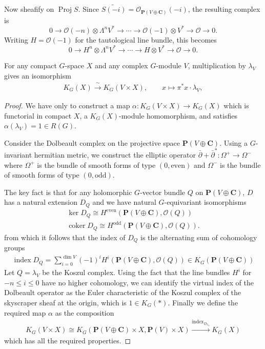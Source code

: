 \documentclass[12pt]{article}
\begin{document}
Now sheafify on $\operatorname{Proj}S$. Since
$\widetilde{S(-i)} = \mathcal O_{\mathbf P(V\oplus\mathbf C)}(-i)$, the resulting complex
is
\[
0\to \mathcal O(-n)\otimes\Lambda^nV^* \to\cdots\to \mathcal O(-1)\otimes V^* \to
\mathcal O \to 0.
\]
Writing $H=\mathcal O(-1)$ for the tautological line bundle, this becomes
\[
0\to H^n\otimes\Lambda^nV^* \to\cdots\to H\otimes V^* \to \mathcal O \to 0.
\]
\begin{theorem}
    For any compact $G$-space $X$ and any complex $G$-module $V$, multiplication by $\lambda_V$ gives an isomorphism
\begin{align*}
    K_G(X) \xrightarrow{\ \sim\ } K_G(V\times X), \qquad x\longmapsto \pi^*x\cdot\lambda_V,
\end{align*}
\end{theorem}
\begin{proof}
    We have only to construct a map $\alpha:K_G(V\times X)\to K_G(X)$ which is functorial in compact $X$, a $K_G(X)$-module homomorphism, and satisfies $\alpha(\lambda_V)=1 \in R(G)$. 

    Consider the Dolbeault complex on the projective space $\mathbf P(V\oplus\mathbf C)$. Using a $G$-invariant hermitian metric, we construct the elliptic operator $\bar\partial+\bar\partial^*:\Omega^+ \to \Omega^-$ where $\Omega^+$ is the bundle of smooth forms of type $(0,\mathrm{even})$ and $\Omega^-$ is the bundle of smooth forms of type $(0,\mathrm{odd})$.  

    The key fact is that for any holomorphic $G$-vector bundle $Q$ on $\mathbf P(V\oplus\mathbf C)$, $D$ has a natural extension $D_Q$ and we have natural $G$-equivariant isomorphisms \begin{align*}
        \ker D_Q \cong H^{\text{even}}(\mathbf P(V\oplus\mathbf C),\mathcal O(Q)) \\
        \operatorname{coker}D_Q \cong H^{\text{odd}}(\mathbf P(V\oplus\mathbf C),\mathcal O(Q)).
    \end{align*}
from which it follows that the index of $D_Q$ is the alternating sum of cohomology groups \begin{align*}
    \operatorname{index}D_Q = \sum_{i=0}^{\dim V}(-1)^i H^i(\mathbf P(V\oplus\mathbf C),\mathcal O(Q)) \in K_G(\mathbf P(V\oplus\mathbf C))
    \end{align*}
    Let $Q = \lambda_V$ be the Koszul complex. Using the fact that the line bundles $H^i$ for $-n\leq i \leq 0$ have no higher cohomology, we can identify the virtual index of the Dolbeault operator as the Euler characteristic of the Koszul complex of the skyscraper sheaf at the origin, which is $1 \in K_G(*)$. Finally we define the required map $\alpha$ as the composition \begin{align*}
        K_G(V\times X) \cong K_G(\mathbf P(V\oplus\mathbf C)\times X,\mathbf P(V)\times X) \xrightarrow{\operatorname{index}_{D_{\lambda_V}}} K_G(X)
    \end{align*} which has all the required properties.
\end{proof}
\end{document}
